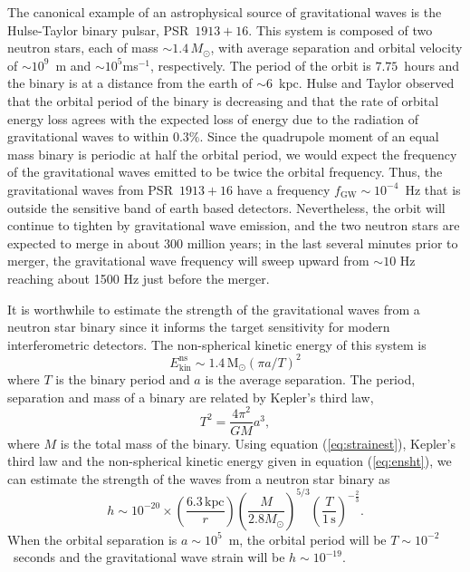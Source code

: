 The canonical example of an astrophysical source of gravitational waves is the
Hulse-Taylor binary pulsar, PSR~$1913+16$\cite{1975ApJ...195L..51H}. This
system is composed of two neutron stars, each of mass $\sim 1.4\,M_\odot$,
with average separation and orbital velocity of $\sim10^9$~m and $\sim
10^5$ms$^{-1}$, respectively. The period of the orbit is $7.75$~hours and the
binary is at a distance from the earth of $\sim 6$~kpc.  Hulse and Taylor
observed that the orbital period of the binary is decreasing and that the rate
of orbital energy loss agrees with the expected loss of energy due to the
radiation of gravitational waves to within
$0.3\%$\cite{Taylor:1982,Taylor:1989}.   Since the quadrupole moment
of an equal mass binary is periodic at half the orbital period, we would
expect the frequency of the gravitational waves emitted to be twice
the orbital frequency.  Thus, the gravitational waves from PSR~$1913+16$ have
a frequency $f_\mathrm{GW} \sim 10^{-4}$~Hz that is outside the
sensitive band of earth based detectors.   Nevertheless,  the orbit
will continue to tighten by gravitational wave emission, and the two
neutron stars are expected to merge in about 300 million years;   in the last
several minutes prior to merger,  the gravitational wave frequency will sweep
upward from $\sim 10$ Hz reaching about 1500 Hz just before the merger.

It is worthwhile to estimate the strength of the gravitational waves from
a neutron star binary since it informs the target sensitivity for
modern interferometric detectors.   The non-spherical kinetic energy
of this system is 
\begin{equation}
E_\mathrm{kin}^\mathrm{ns} \sim 
1.4\,\mathrm{M}_\odot (\pi a / T)^2
\label{eq:ensht}
\end{equation}
where $T$ is the binary period and $a$ is the average separation.  The period,
separation and mass of a binary are related by Kepler's third law,
\begin{equation}
T^2 = \frac{4\pi^2}{GM}a^3,
\label{eq:kep3}
\end{equation}
where $M$ is the total mass of the binary.  Using equation
(\ref{eq:strainest}), Kepler's third law and the non-spherical kinetic energy
given in equation (\ref{eq:ensht}), we can estimate the strength of the waves
from a neutron star binary as
\begin{equation}
h \sim 10^{-20} \times 
\left(\frac{6.3\,\mathrm{kpc}}{r}\right)
\left(\frac{M}{2.8M_\odot}\right)^{5/3}
\left(\frac{T}{1\,\mathrm{s}}\right)^{-\frac{2}{3}}.
\label{eq:binaryest}
\end{equation}
When the orbital separation is $a \sim 10^5$~m,  the orbital period will be
$T\sim10^{-2}$~seconds and the gravitational wave strain will be 
$h \sim 10^{-19}$.

